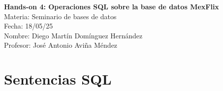 \documentclass[12pt,a4paper]{article}
\begin{document}
\begin{titlepage}
    \centering
    \vspace*{4cm}
    \Huge{\textbf{Hands-on 4: Operaciones SQL sobre la base de datos MexFlix}}\\[1.5cm]
    \Large{Materia: Seminario de bases de datos\\[0.5cm]}
    \Large{Fecha: 18/05/25\\[0.5cm]}
    \Large{Nombre: Diego Martín Domínguez Hernández\\[2cm]}
    \Large{Profesor: José Antonio Aviña Méndez\\}
\end{titlepage}

\section{Sentencias SQL}
\end{document}
